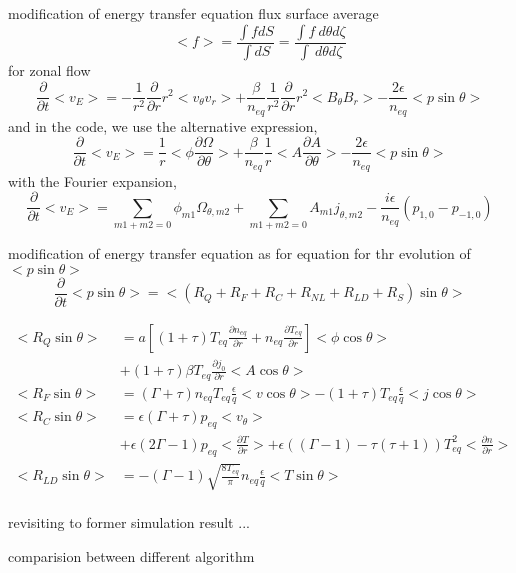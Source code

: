 \documentclass{beamer}
\begin{document}
\begin{frame}{modification of energy transfer equation}
	flux surface average
	\begin{equation}
		<f>=\frac{\int{f}dS}{\int{dS}}
		=\frac{\int{f}\ d\theta{d\zeta}}{\int\ d\theta{d\zeta}}
	\end{equation}
	for zonal flow 
	\begin{equation}
		\frac{\partial}{\partial{t}}<v_E>
		=-\frac{1}{r^2}\frac{\partial}{\partial{r}}r^2<v_\theta{v_r}>
		+\frac{\beta}{n_{eq}}\frac{1}{r^2}\frac{\partial}{\partial{r}}r^2<B_\theta{B_r}>
		-\frac{2\epsilon}{n_{eq}}<p\sin\theta>
	\end{equation}
	and in the code, we use the alternative expression,
	\begin{equation}
	\frac{\partial}{\partial{t}}<v_E>
	=\frac{1}{r}<\phi\frac{\partial{\Omega}}{\partial\theta}>
	+\frac{\beta}{n_{eq}}\frac{1}{r}<A\frac{\partial{A}}{\partial\theta}>
	-\frac{2\epsilon}{n_{eq}}<p\sin\theta>
	\end{equation} 
	with the Fourier expansion,
	\begin{equation}
	\frac{\partial}{\partial{t}}<v_E>
	=\sum_{m1+m2=0}{\phi_{m1}}{\Omega_{\theta,m2}}
	+\sum_{m1+m2=0}{A_{m1}}{j_{\theta,m2}}
	-\frac{i\epsilon}{n_{eq}}(p_{1,0}-p_{-1,0})
	\end{equation} 
\end{frame}
	
	
\begin{frame}{modification of energy transfer equation}
	as for equation for thr evolution of $<p\sin\theta>$
	\begin{equation}
		\frac{\partial}{\partial{t}}<p\sin\theta>
		=<(R_Q+R_F+R_C+R_{NL}+R_{LD}+R_{S})\sin\theta>
	\end{equation}

	\begin{equation}
	\begin{aligned}
		<R_Q\sin\theta>&=
		a[(1+\tau)T_{eq}\frac{\partial{n_{eq}}}{\partial{r}}+n_{eq}\frac{\partial{T_{eq}}}{\partial{r}}]<\phi\cos\theta>\\
		&+(1+\tau)\beta{T_{eq}}\frac{\partial{j_0}}{\partial{r}}<A\cos\theta>\\
		<R_F\sin\theta>&=
		(\Gamma+\tau)n_{eq}T_{eq}\frac{\epsilon}{q}<v\cos\theta>
		-(1+\tau)T_{eq}\frac{\epsilon}{q}<j\cos\theta>	\\
		<R_C\sin\theta>&=
		\epsilon(\Gamma+\tau)p_{eq}<v_\theta>	\\
		&+\epsilon(2\Gamma-1)p_{eq}<\frac{\partial{T}}{\partial{r}}>
		+\epsilon((\Gamma-1)-\tau(\tau+1))T_{eq}^2<\frac{\partial{n}}{\partial{r}}>	\\
		<R_{LD}\sin\theta>&=
		-(\Gamma-1)\sqrt{\frac{8T_{eq}}{\pi}}n_{eq}\frac{\epsilon}{q}<T\sin\theta>	\\
	\end{aligned}
	\end{equation}
\end{frame}	
	


\begin{frame}{revisiting to former simulation result}
	...
\end{frame}


\begin{frame}{comparision between different algorithm}
	
\end{frame}
\end{document}
